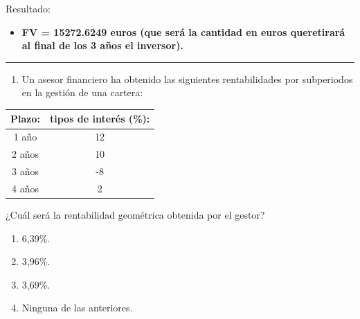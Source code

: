 \documentclass[
  letterpaper,
  DIV=11,
  numbers=noendperiod]{scrreprt}
\providecommand{\tightlist}{%
  \setlength{\itemsep}{0pt}\setlength{\parskip}{0pt}}\usepackage{longtable,booktabs,array}
\begin{document}
\begin{tcolorbox}[enhanced jigsaw, left=2mm, opacityback=0, colback=white, breakable, arc=.35mm, bottomrule=.15mm, rightrule=.15mm, toprule=.15mm, leftrule=.75mm, colframe=quarto-callout-tip-color-frame]
\begin{minipage}[t]{\textwidth - 5.5mm}
Resultado:

\begin{itemize}
\tightlist
\item
  \textbf{FV = 15272.6249 euros (que será la cantidad en euros
  queretirará al final de los 3 años el inversor).}
\end{itemize}

\end{minipage}%
\end{tcolorbox}

\begin{center}\rule{0.5\linewidth}{0.5pt}\end{center}

\begin{enumerate}
\def\labelenumi{\arabic{enumi}.}
\setcounter{enumi}{37}
\tightlist
\item
  Un asesor financiero ha obtenido las siguientes rentabilidades por
  subperiodos en la gestión de una cartera:
\end{enumerate}

\begin{longtable}[]{@{}cc@{}}
\toprule()
\textbf{Plazo:} & \textbf{tipos de interés (\%):} \\
\midrule()
\endhead
1 año & 12 \\
2 años & 10 \\
3 años & -8 \\
4 años & 2 \\
\bottomrule()
\end{longtable}

¿Cuál será la rentabilidad geométrica obtenida por el gestor?

\begin{enumerate}
\def\labelenumi{\alph{enumi})}
\item
  6,39\%.
\item
  3,96\%.
\item
  3,69\%.
\item
  Ninguna de las anteriores.
\end{enumerate}
\end{document}
